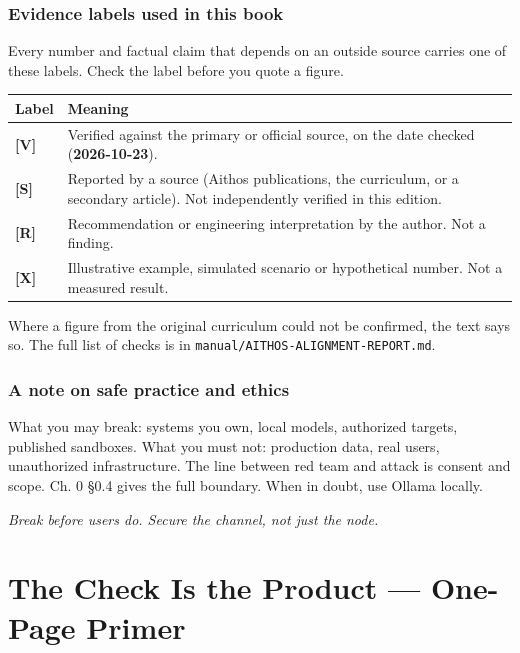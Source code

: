 \subsection*{Evidence labels used in this book}
Every number and factual claim that depends on an outside source carries one of these labels. Check the label before you quote a figure.
\begin{center}
\begin{tabularx}{\linewidth}{lX}
\toprule
Label & Meaning \\
\midrule
\textbf{[V]} & Verified against the primary or official source, on the date checked (\textbf{2026-10-23}). \\
\textbf{[S]} & Reported by a source (Aithos publications, the curriculum, or a secondary article). Not independently verified in this edition. \\
\textbf{[R]} & Recommendation or engineering interpretation by the author. Not a finding. \\
\textbf{[X]} & Illustrative example, simulated scenario or hypothetical number. Not a measured result. \\
\bottomrule
\end{tabularx}
\end{center}
Where a figure from the original curriculum could not be confirmed, the text says so. The full list of checks is in \texttt{manual/AITHOS-ALIGNMENT-REPORT.md}.

\subsection*{A note on safe practice and ethics}
What you may break: systems you own, local models, authorized targets, published sandboxes. What you must not: production data, real users, unauthorized infrastructure. The line between red team and attack is consent and scope. Ch. 0 §0.4 gives the full boundary. When in doubt, use Ollama locally.

\vspace{1em}
\begin{center}
\small\itshape Break before users do. Secure the channel, not just the node.
\end{center}

\newpage

\chapter*{The Check Is the Product — One-Page Primer}

